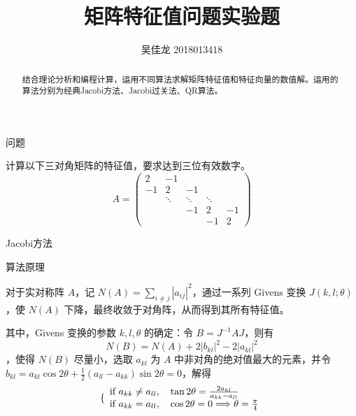 \documentclass[a4paper]{article}
\providecommand{\keywords}[1]{\textbf{\textit{关键词}} #1}
\begin{document}
 
\title{矩阵特征值问题实验题}
\author{吴佳龙 2018013418}
\date{}
\maketitle

\begin{abstract}
	结合理论分析和编程计算，运用不同算法求解矩阵特征值和特征向量的数值解。运用的算法分别为经典Jacobi方法、Jacobi过关法、QR算法。
\end{abstract}


\begin{multicols}{2}

\begin{section}{问题}

	计算以下三对角矩阵的特征值，要求达到三位有效数字。
	$$A=\left(\begin{array}{ccccc}{2} & {-1} & {} & {} & {} \\ {-1} & {2} & {-1} & {} & {} \\ {} & {\ddots} & {\ddots} & {\ddots} & {} \\ {} & {} & {-1} & {2} & {-1} \\ {} & {} & {} & {-1} & {2}\end{array}\right)$$
	
\end{section}

\begin{section}{Jacobi方法}

	\begin{subsection}{算法原理}
			
		对于实对称阵 $A$，记 $N(A)=\sum_{i \neq j}\left|a_{i j}\right|^{2}$，通过一系列 Givens 变换 $J(k,l;\theta)$，使 $N(A)$ 下降，最终收敛于对角阵，从而得到其所有特征值。
		
		其中，Givens 变换的参数 $k,l,\theta$ 的确定：令 $B = J^{-1}AJ$，则有 $$N(B) = N(A)+2\left|b_{k l}\right|^{2}-2\left|a_{k l}\right|^{2}$$，使得 $N(B)$ 尽量小，选取 $a_{kl}$ 为 $A$ 中非对角的绝对值最大的元素，并令 $b_{k l}=a_{k l} \cos 2 \theta+\frac{1}{2}\left(a_{l l}-a_{k k}\right) \sin 2 \theta=0$，解得 $$
			\{\begin{array}{l} { \text{if } a_{k k} \neq a_{l l} , \quad \tan {2\theta} = {2 a_{k l}\over a_{k k}-a_{l l}} } \\ {\text{if } a_{k k}=a_{l l} , \quad \cos 2 \theta=0 \Longrightarrow \theta={ \pi \over 4} } \end{array}$$
		

\end{subsection}
\end{section}
\end{multicols}
\end{document}
